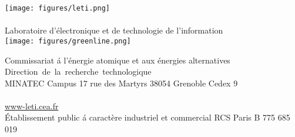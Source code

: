 \documentclass[francais]{rapport-leti}
\begin{document}
\vspace{-8mm}
\noindent%
\small\texttt{[image: figures/leti.png]}\\
  \color{blue!60!black}\\[-1.5ex]
  {Laboratoire d'\'electronique et de technologie de l'information}\\
  \texttt{[image: figures/greenline.png]}

\footnotesize\color{gray!50!black}Commissariat \'a l'\'energie atomique et aux \'energies alternatives
  \hspace{1.9cm}\hbox{Direction de la recherche technologique}\\[-0.5ex]
  MINATEC Campus \textbar{} 17 rue des Martyrs \textbar{} 38054 Grenoble Cedex 9\\[-0.5ex]
      \\[-2.5ex]
  \url{www-leti.cea.fr}\\[-0.5ex]
  {\scriptsize \'Etablissement public \'a caract\`ere industriel et commercial RCS Paris B 775 685 019}


\normalsize

\newpage
\pagestyle{plain}
\tableofcontents
\newpage


\pagestyle{normal}







\end{document}
